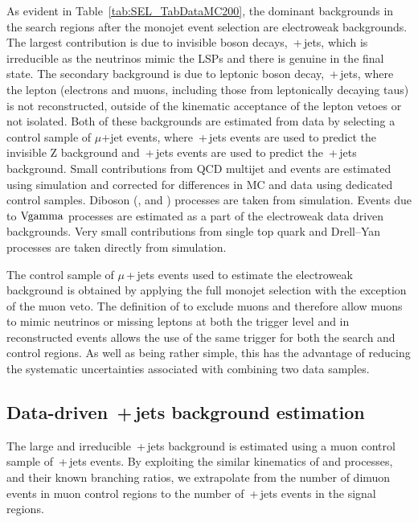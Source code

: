 As evident in Table~\ref{tab:SEL_TabDataMC200}, the dominant backgrounds in the search regions after the monojet event selection are electroweak backgrounds.
The largest contribution is due to invisible \Z{} boson decays, \znunubr\,+\,jets, which is irreducible as the neutrinos mimic the \ac{LSP}s and there is genuine \MET in the final state. 
The secondary background is due to leptonic \W{} boson decay, \wlnubr\,+\,jets, where the lepton (electrons and muons, including those from leptonically decaying taus) is not reconstructed, outside of the kinematic acceptance of the lepton vetoes or not isolated.
Both of these backgrounds are estimated from data by selecting a control sample of $\mu$+jet events, where \zmumubr\,+\,jets events are used to predict the invisible Z background and \wmunubr\,+\,jets events are used to predict the \wlnubr\,+\,jets background.
Small contributions from \ac{QCD} multijet and \ttbar{} events are estimated using simulation and corrected for differences in MC and data using dedicated control samples.
Diboson (\W\W{}, \W\Z{} and \Z\Z{}) processes are taken from simulation. Events due to $\rm{V}\gamma$ processes are estimated as a part of the electroweak data driven backgrounds.
Very small contributions from single top quark and Drell--Yan processes are taken directly from simulation.


The control sample of $\mu$\,+\,jets events used to estimate the electroweak background is 
obtained by applying the full monojet selection with the exception of the muon veto.
The definition of \METmu to exclude muons and therefore allow muons to mimic neutrinos or missing leptons at both the trigger level and in reconstructed events allows the use of the same trigger for both the search and control regions. 
As well as being rather simple, this has the advantage of reducing the systematic uncertainties associated with combining two data samples.

\subsection{Data-driven \znunubr\,+\,jets background estimation}
\label{sec:znunu}

The large and irreducible \znunubr\,+\,jets background is estimated using a muon control sample of \zmumubr\,+\,jets events.
By exploiting the similar kinematics of \znunu and \zmumu processes, and their known branching ratios, we extrapolate from the number of dimuon events in muon control regions to the number of \znunubr\,+\,jets events in the signal regions.

